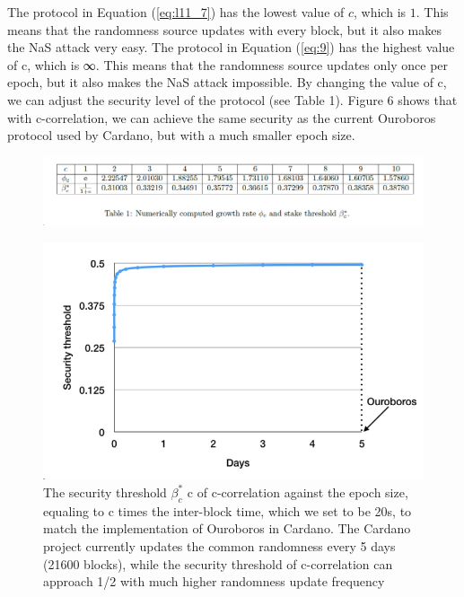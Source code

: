 The protocol in Equation (\ref{eq:l11_7}) has the lowest value of $c$, which is $1$. This means that the randomness source updates with every block, but it also makes the NaS attack very easy. The protocol in Equation (\ref{eq:9}) has the highest value of c, which is ∞. This means that the randomness source updates only once per epoch, but it also makes the NaS attack impossible. By changing the value of c, we can adjust the security level of the protocol (see Table 1). Figure 6 shows that with c-correlation, we can achieve the same security as the current Ouroboros protocol used by Cardano, but with a much smaller epoch size.
\begin{figure}[h!]
	\centering
	\includegraphics[width=\linewidth]{Fig/11/F6}
\end{figure}
\begin{figure}[h!]
	\centering
	\includegraphics[width=0.5\linewidth]{Fig/11/F7}
	\caption{The security threshold $\beta_c^*$
		c of c-correlation against the epoch size, equaling to c times the
		inter-block time, which we set to be 20s, to match the implementation of Ouroboros in Cardano. The
		Cardano project currently updates the common randomness every 5 days (21600 blocks), while the
		security threshold of c-correlation can approach 1/2 with much higher randomness update frequency}
	\label{fig:l11_f7}
\end{figure}

